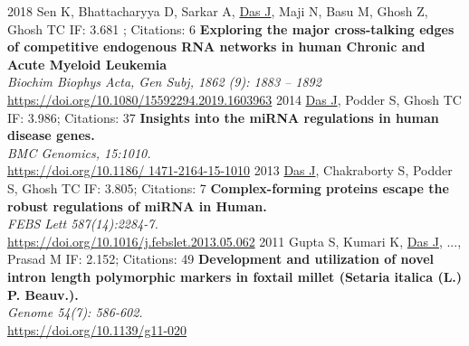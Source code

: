 \documentclass[]{friggeri-cv}
\begin{document}
\begin{entrylist}
\entry
	{2018}
	{Sen K, Bhattacharyya D, Sarkar A, \underline{Das J}, Maji N, Basu M, Ghosh Z, Ghosh TC}
	{IF: 3.681 ; Citations: 6}
	{\textbf{Exploring the major cross-talking edges of competitive endogenous RNA networks in human Chronic and Acute Myeloid Leukemia}\\
	\emph{Biochim Biophys Acta, Gen Subj, 1862 (9): 1883 – 1892}\\ \href{https://doi.org/10.1016/j.bbagen.2018.06.002}{https://doi.org/10.1080/15592294.2019.1603963}}
\entry
	{2014}
	{\underline{Das J}, Podder S, Ghosh TC}
	{IF: 3.986; Citations: 37}
	{\textbf{Insights into the miRNA regulations in human disease genes.}\\
	\emph{BMC Genomics, 15:1010.}\\ \href{https://bmcgenomics.biomedcentral.com/track/pdf/10.1186/1471-2164-15-1010}{https://doi.org/10.1186/ 1471-2164-15-1010}}
\entry
	{2013}
	{\underline{Das J}, Chakraborty S, Podder S, Ghosh TC}
	{IF: 3.805; Citations: 7}
	{\textbf{Complex-forming proteins escape the robust regulations of miRNA in Human.}\\
	\emph{FEBS Lett 587(14):2284-7.}\\ \href{https://www.sciencedirect.com/science/article/pii/S0014579313004419}{https://doi.org/10.1016/j.febslet.2013.05.062}}
\entry
	{2011}
	{Gupta S, Kumari K, \underline{Das J}, ..., Prasad M}
	{IF: 2.152; Citations: 49}
	{\textbf{Development and utilization of novel intron length polymorphic markers in foxtail millet (Setaria italica (L.) P. Beauv.).}\\
	\emph{Genome 54(7): 586-602.}\\
	 \href{https://doi.org/10.1139/g11-020}{https://doi.org/10.1139/g11-020\\}}
\end{entrylist}
\end{document}
